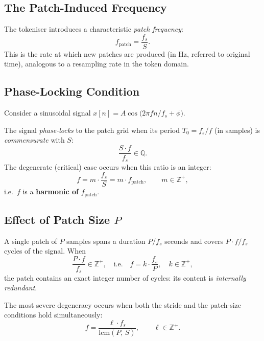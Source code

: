 \subsection{The Patch-Induced Frequency}

The tokeniser introduces a characteristic \emph{patch frequency}:
\begin{equation}
    f_{\mathrm{patch}} = \frac{f_s}{S}.
\end{equation}
This is the rate at which new patches are produced (in Hz, referred to original time),
analogous to a resampling rate in the token domain.

\subsection{Phase-Locking Condition}

Consider a sinusoidal signal $x[n] = A\cos\!\bigl(2\pi f n / f_s + \phi\bigr)$.

\begin{definition}
    The signal \emph{phase-locks} to the patch grid when its period $T_0 = f_s/f$ (in
    samples) is \emph{commensurate} with $S$:
    \begin{equation}
        \frac{S \cdot f}{f_s} \in \mathbb{Q}.
    \end{equation}
    The degenerate (critical) case occurs when this ratio is an integer:
    \begin{equation}
        f = m \cdot \frac{f_s}{S} = m \cdot f_{\mathrm{patch}},
        \qquad m \in \mathbb{Z}^+,
    \end{equation}
    i.e.\ $f$ is a \textbf{harmonic of} $f_{\mathrm{patch}}$.
\end{definition}

\subsection{Effect of Patch Size $P$}

A single patch of $P$ samples spans a duration $P/f_s$ seconds and covers
$P \cdot f / f_s$ cycles of the signal.  When
\begin{equation}
    \frac{P \cdot f}{f_s} \in \mathbb{Z}^+,
    \quad \text{i.e.} \quad
    f = k \cdot \frac{f_s}{P}, \quad k \in \mathbb{Z}^+,
\end{equation}
the patch contains an exact integer number of cycles: its content is \emph{internally
redundant}.

The most severe degeneracy occurs when both the stride and the patch-size conditions hold
simultaneously:
\begin{equation}
    f = \frac{\ell \cdot f_s}{\mathrm{lcm}(P,\, S)},
    \qquad \ell \in \mathbb{Z}^+.
\end{equation}

